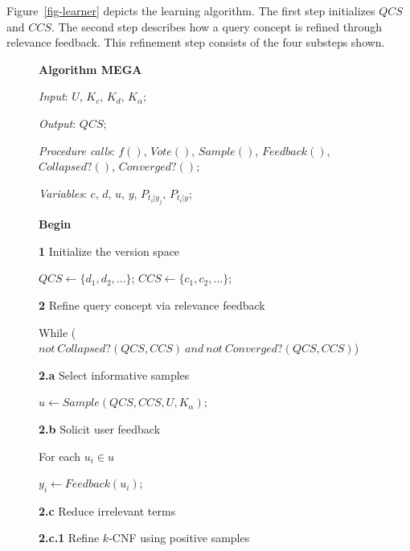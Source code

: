 Figure~\ref{fig-learner} depicts the learning algorithm.
The first step initializes $QCS$ and $CCS$.
The second step describes how a query concept is
refined through relevance feedback. This refinement
step consists of the four substeps shown.

\begin{figure}[htbp]
{\bf Algorithm MEGA}
\begin{nlist} 
\item {\it Input}: $U$, $K_c$, $K_d$, $K_{\alpha}$;
\item {\it Output}: $QCS$;
\item {\it Procedure calls}: $f()$, $Vote()$, $Sample()$, $Feedback()$, 
                            $Collapsed?()$, $Converged?()$;
\item {\it Variables}: $c$, $d$, $u$, $y$, $P_{t_i|y_j}$, $P_{t_i|y}$;
\item {\bf Begin}
\item {\bf 1} Initialize the version space
 \begin{nlist}
 \item $QCS \leftarrow \{d_1, d_2, \dots\}$; $CCS \leftarrow \{c_1, c_2, \dots\}$;
 \end{nlist}
\item {\bf 2} Refine query concept via relevance feedback
  \begin{nlist}
   \item {While} ($not~Collapsed?(QCS, CCS)~and~not~Converged?(QCS, CCS)$) 
   \item {\bf 2.a} Select informative samples
   \begin{nlist}
   \item $u \leftarrow Sample(QCS, CCS, U, K_{\alpha})$; 
   \end{nlist}
   \item {\bf 2.b} Solicit user feedback
   \begin{nlist}
   \item For each $u_i \in u$
    \begin{nlist}
    \item $y_i \leftarrow Feedback(u_i)$; 
    \end{nlist}
   \end{nlist}
   \item {\bf 2.c} Reduce irrelevant terms
   \begin{nlist}
   \item {\bf 2.c.1} Refine $k$-CNF using positive samples


\end{nlist}
\end{nlist}
\end{nlist}
\end{figure}
